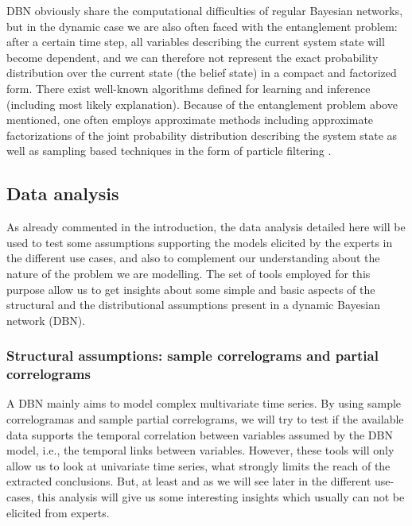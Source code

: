 DBN obviously share the computational difficulties of regular Bayesian networks, but in the dynamic case we are also often faced with the entanglement problem: after a certain time step, all variables describing the current system state will become dependent, and we can therefore not represent the exact probability distribution over the current state (the belief state) in a compact and factorized form. There exist well-known algorithms defined for learning and inference (including most likely explanation). Because of the entanglement problem above mentioned, one often employs approximate methods including approximate factorizations of the joint probability distribution describing the system state \cite{BoyenKoller1998} as well as sampling based techniques in the form of particle filtering \cite{Doucet2000}.

\subsection{Data analysis}\label{SubSection:DataAnalysis}

As already commented in the introduction, the data analysis detailed here will be used to test some assumptions supporting the models elicited by the experts in the different use cases, and also to complement our understanding about the nature of the problem we are modelling. The set of tools employed for this purpose allow us to get insights about some simple and basic aspects of the structural and the distributional assumptions present in a dynamic Bayesian network (DBN).

\subsubsection*{Structural assumptions: sample correlograms and partial correlograms}

A DBN mainly aims to model complex multivariate time series. By using sample correlogramas and sample partial correlograms, we will try to test if the available data supports the temporal correlation between variables assumed by the DBN model, i.e., the temporal links between variables. However, these tools will only allow us to look at univariate time series, what strongly limits the reach of the  extracted conclusions. But, at least and as we will see later in the different use-cases, this analysis will give us some interesting insights which usually can not be elicited from experts.  

